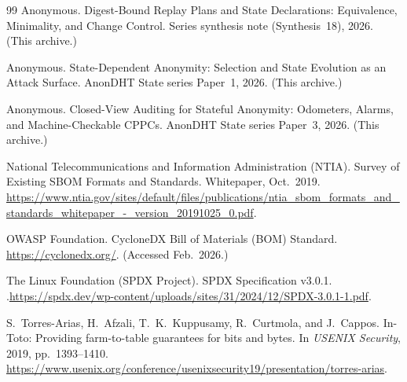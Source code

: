 \documentclass[11pt]{article}
\begin{document}
\begin{thebibliography}{99}
Anonymous.
\newblock Digest-Bound Replay Plans and State Declarations: Equivalence, Minimality, and Change Control.
\newblock Series synthesis note (Synthesis~18), 2026. (This archive.)

Anonymous.
\newblock State-Dependent Anonymity: Selection and State Evolution as an Attack Surface.
\newblock AnonDHT State series Paper~1, 2026. (This archive.)

Anonymous.
\newblock Closed-View Auditing for Stateful Anonymity: Odometers, Alarms, and Machine-Checkable CPPCs.
\newblock AnonDHT State series Paper~3, 2026. (This archive.)

National Telecommunications and Information Administration (NTIA).
\newblock Survey of Existing SBOM Formats and Standards.
\newblock Whitepaper, Oct.~2019.\;
\newblock \url{https://www.ntia.gov/sites/default/files/publications/ntia_sbom_formats_and_standards_whitepaper_-_version_20191025_0.pdf}.

OWASP Foundation.
\newblock CycloneDX Bill of Materials (BOM) Standard.
\newblock \url{https://cyclonedx.org/}. (Accessed Feb.~2026.)

The Linux Foundation (SPDX Project).
\newblock SPDX Specification v3.0.1.
.\;\url{https://spdx.dev/wp-content/uploads/sites/31/2024/12/SPDX-3.0.1-1.pdf}.

S.~Torres-Arias, H.~Afzali, T.~K.~Kuppusamy, R.~Curtmola, and J.~Cappos.
\newblock In-Toto: Providing farm-to-table guarantees for bits and bytes.
\newblock In \emph{USENIX Security}, 2019, pp.~1393--1410.\;
\newblock \url{https://www.usenix.org/conference/usenixsecurity19/presentation/torres-arias}.
\end{thebibliography}
\end{document}
